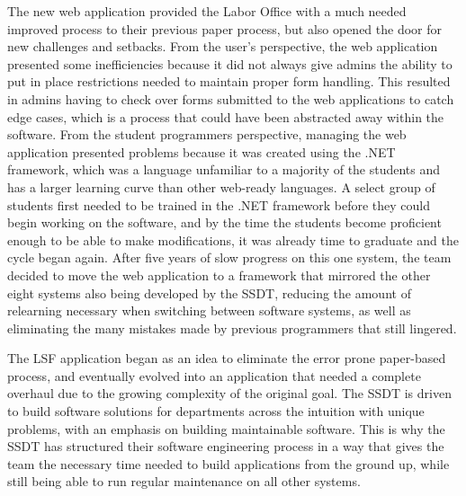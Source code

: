 The new web application provided the Labor Office with a much needed improved process to their previous paper process, but also opened the door for new challenges and setbacks. From the user's perspective, the web application presented some inefficiencies because it did not always give admins the ability to put in place restrictions needed to maintain proper form handling. This resulted in admins having to check over forms submitted to the web applications to catch edge cases, which is a process that could have been abstracted away within the software. From the student programmers perspective, managing the web application presented problems because it was created using the .NET framework, which was a language unfamiliar to a majority of the students and has a larger learning curve than other web-ready languages. A select group of students first needed to be trained in the .NET framework before they could begin working on the software, and by the time the students become proficient enough to be able to make modifications, it was already time to graduate and the cycle began again. After five years of slow progress on this one system, the team decided to move the web application to a framework that mirrored the other eight systems also being developed by the SSDT, reducing the amount of relearning necessary when switching between software systems, as well as eliminating the many mistakes made by previous programmers that still lingered.

The LSF application began as an idea to eliminate the error prone paper-based process, and eventually evolved into an application that needed a complete overhaul due to the growing complexity of the original goal. The SSDT is driven to build software solutions for departments across the intuition with unique problems, with an emphasis on building maintainable software. This is why the SSDT has structured their software engineering process in a way that gives the team the necessary time needed to build applications from the ground up, while still being able to run regular maintenance on all other systems.





















